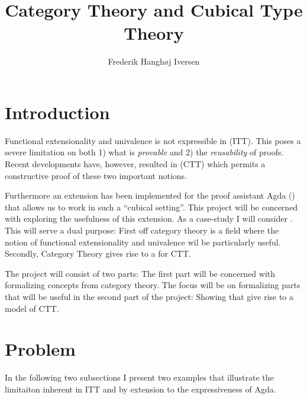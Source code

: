 \documentclass{article}
\title{Category Theory and Cubical Type Theory}
\author{Frederik Hanghøj Iversen}
\newcommand{\sectiondescription}[1]{\iffalse #1\fi}
\begin{document}
\maketitle
%
\sectiondescription{Text marked like this describe what should go in the section.}
%
\section{Introduction}
%
\sectiondescription{%
Briefly describe and motivate the project, and convince the reader of the
importance of the proposed thesis work. A good introduction will answer these
questions: Why is addressing these challenges significant for gaining new
knowledge in the studied domain? How and where can this new knowledge be
applied?
}
%
Functional extensionality and univalence is not expressible in
 (ITT). This poses a severe limitation
on both 1) what is \emph{provable} and 2) the \emph{reusability} of proofs.
Recent developments have, however, resulted in  (CTT)
which permits a constructive proof of these two important notions.

Furthermore an extension has been implemented for the proof assistant Agda
(\cite{agda}) that allows us to work in such a ``cubical setting''. This project
will be concerned with exploring the usefulness of this extension. As a
case-study I will consider . This will serve a dual
purpose: First off category theory is a field where the notion of functional
extensionality and univalence wil be particularly useful. Secondly, Category
Theory gives rise to a  for CTT.

The project will consist of two parts: The first part will be concerned with
formalizing concepts from category theory. The focus will be on formalizing
parts that will be useful in the second part of the project: Showing that
 give rise to a model of CTT.
%
\section{Problem}
%
\sectiondescription{%
This section is optional. It may be used if there is a need to describe the
problem that you want to solve in more technical detail and if this problem
description is too extensive to fit in the introduction.
}
%
In the following two subsections I present two examples that illustrate the
limitaiton inherent in ITT and by extension to the expressiveness of Agda.
%
\end{document}

